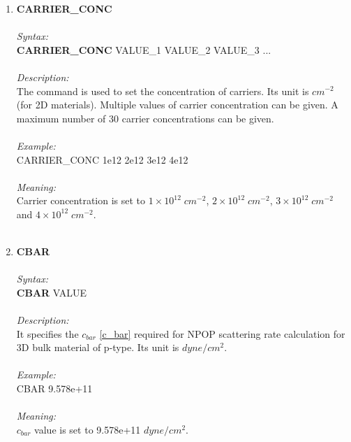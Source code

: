 \documentclass[12pt]{article}
\begin{document}
\begin{enumerate}
   \item \textbf{CARRIER\_CONC} \\ \\
    \textit{Syntax:} \\
    \textbf{CARRIER\_CONC} VALUE\_1 VALUE\_2 VALUE\_3 ... \\ \\ 
    \textit{Description:} \\
    The command is used to set the concentration of carriers. Its unit is $cm^{-2}$ (for 2D materials). Multiple values of carrier concentration can be given. A maximum number of 30 carrier concentrations can be given. \\ \\  
    \textit{Example:} \\
    CARRIER\_CONC 1e12 2e12 3e12 4e12 \\ \\
    \textit{Meaning:} \\  
    Carrier concentration is set to $1 \times 10^{12} \; cm^{-2} $, $2 \times 10^{12} \; cm^{-2} $, $3 \times 10^{12} \; cm^{-2} $ and $4 \times 10^{12} \; cm^{-2}$. \\ \\

    \item \textbf{CBAR} \\ \\
    \textit{Syntax:} \\
    \textbf{CBAR} VALUE \\ \\
    \textit{Description:} \\
    It specifies the $c_{bar}$ \ref{c_bar} required for NPOP scattering rate calculation for 3D bulk material of p-type. Its unit is $dyne/cm^2$. \\ \\
    \textit{Example:} \\
    CBAR 9.578e+11 \\ \\
    \textit{Meaning:} \\ 
    $c_{bar}$ value is set to 9.578e+11 $dyne/cm^2$. \\ \\
    


\end{enumerate}
\end{document}
